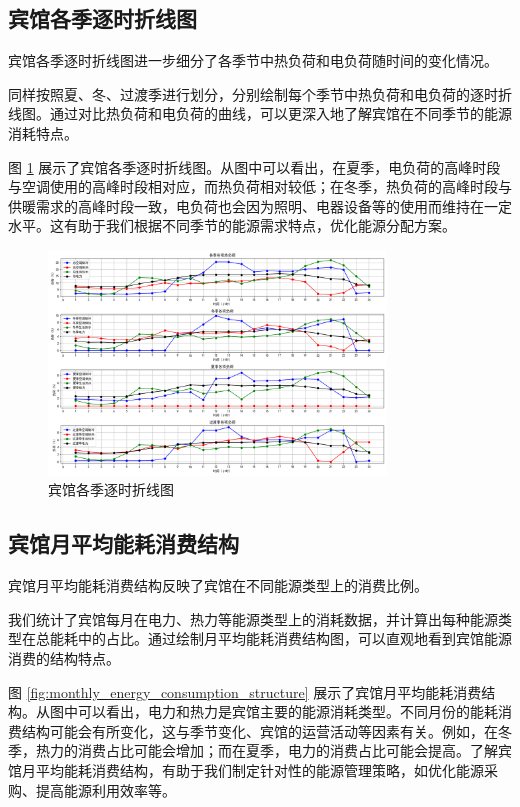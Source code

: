 \documentclass[UTF8]{ctexart}
\begin{document}
\subsection{宾馆各季逐时折线图}
宾馆各季逐时折线图进一步细分了各季节中热负荷和电负荷随时间的变化情况。

同样按照夏、冬、过渡季进行划分，分别绘制每个季节中热负荷和电负荷的逐时折线图。通过对比热负荷和电负荷的曲线，可以更深入地了解宾馆在不同季节的能源消耗特点。

图 \ref{fig:seasonal_hourly_load} 展示了宾馆各季逐时折线图。从图中可以看出，在夏季，电负荷的高峰时段与空调使用的高峰时段相对应，而热负荷相对较低；在冬季，热负荷的高峰时段与供暖需求的高峰时段一致，电负荷也会因为照明、电器设备等的使用而维持在一定水平。这有助于我们根据不同季节的能源需求特点，优化能源分配方案。

\begin{figure}[H]
    \centering
    \includegraphics[width=0.8\textwidth]{image/Figure_3.png}
    \caption{宾馆各季逐时折线图}
    \label{fig:seasonal_hourly_load}
\end{figure}

\subsection{宾馆月平均能耗消费结构}
宾馆月平均能耗消费结构反映了宾馆在不同能源类型上的消费比例。

我们统计了宾馆每月在电力、热力等能源类型上的消耗数据，并计算出每种能源类型在总能耗中的占比。通过绘制月平均能耗消费结构图，可以直观地看到宾馆能源消费的结构特点。

图 \ref{fig:monthly_energy_consumption_structure} 展示了宾馆月平均能耗消费结构。从图中可以看出，电力和热力是宾馆主要的能源消耗类型。不同月份的能耗消费结构可能会有所变化，这与季节变化、宾馆的运营活动等因素有关。例如，在冬季，热力的消费占比可能会增加；而在夏季，电力的消费占比可能会提高。了解宾馆月平均能耗消费结构，有助于我们制定针对性的能源管理策略，如优化能源采购、提高能源利用效率等。
\end{document}
